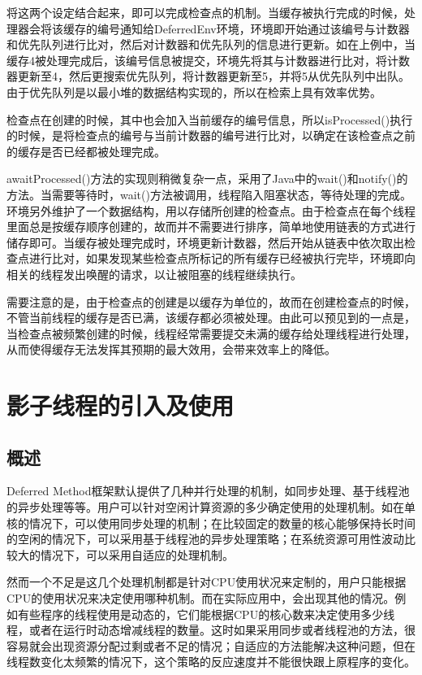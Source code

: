 将这两个设定结合起来，即可以完成检查点的机制。当缓存被执行完成的时候，处理器会将该缓存的编号通知给DeferredEnv环境，环境即开始通过该编号与计数器和优先队列进行比对，然后对计数器和优先队列的信息进行更新。如在上例中，当缓存4被处理完成后，该编号信息被提交，环境先将其与计数器进行比对，将计数器更新至4，然后更搜索优先队列，将计数器更新至5，并将5从优先队列中出队。由于优先队列是以最小堆的数据结构实现的，所以在检索上具有效率优势。

检查点在创建的时候，其中也会加入当前缓存的编号信息，所以isProcessed()执行的时候，是将检查点的编号与当前计数器的编号进行比对，以确定在该检查点之前的缓存是否已经都被处理完成。

awaitProcessed()方法的实现则稍微复杂一点，采用了Java中的wait()和notify()的方法。当需要等待时，wait()方法被调用，线程陷入阻塞状态，等待处理的完成。环境另外维护了一个数据结构，用以存储所创建的检查点。由于检查点在每个线程里面总是按缓存顺序创建的，故而并不需要进行排序，简单地使用链表的方式进行储存即可。当缓存被处理完成时，环境更新计数器，然后开始从链表中依次取出检查点进行比对，如果发现某些检查点所标记的所有缓存已经被执行完毕，环境即向相关的线程发出唤醒的请求，以让被阻塞的线程继续执行。

需要注意的是，由于检查点的创建是以缓存为单位的，故而在创建检查点的时候，不管当前线程的缓存是否已满，该缓存都必须被处理。由此可以预见到的一点是，当检查点被频繁创建的时候，线程经常需要提交未满的缓存给处理线程进行处理，从而使得缓存无法发挥其预期的最大效用，会带来效率上的降低。

\section{影子线程的引入及使用}

\subsection{概述}

Deferred Method框架默认提供了几种并行处理的机制，如同步处理、基于线程池的异步处理等等。用户可以针对空闲计算资源的多少确定使用的处理机制。如在单核的情况下，可以使用同步处理的机制；在比较固定的数量的核心能够保持长时间的空闲的情况下，可以采用基于线程池的异步处理策略；在系统资源可用性波动比较大的情况下，可以采用自适应的处理机制。

然而一个不足是这几个处理机制都是针对CPU使用状况来定制的，用户只能根据CPU的使用状况来决定使用哪种机制。而在实际应用中，会出现其他的情况。例如有些程序的线程使用是动态的，它们能根据CPU的核心数来决定使用多少线程，或者在运行时动态增减线程的数量。这时如果采用同步或者线程池的方法，很容易就会出现资源分配过剩或者不足的情况；自适应的方法能解决这种问题，但在线程数变化太频繁的情况下，这个策略的反应速度并不能很快跟上原程序的变化。

